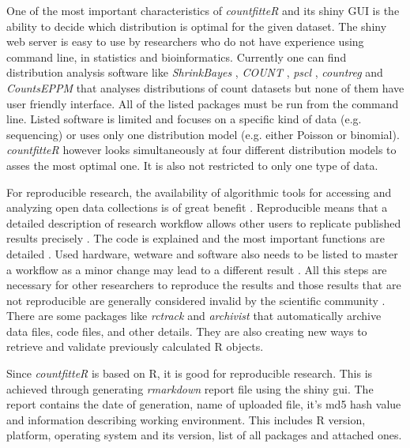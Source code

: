 One of the most important characteristics of \emph{countfitteR} and its shiny GUI is the ability to  decide which distribution is optimal for the given dataset. The shiny web server is easy to use by researchers who do not have experience using command line, in statistics and bioinformatics. 
Currently one can find distribution analysis software like \emph{ShrinkBayes} \citep{shrinkbayes}, \emph{COUNT} \citep{COUNT}, \emph{pscl} \citep{pscl}, \emph{countreg} \citep{countreg} and \emph{CountsEPPM} \citep{countseppm} that analyses distributions of count datasets but none of them have user friendly interface. All of the listed packages must be run from the command line. 
Listed software is limited and focuses on a specific kind of data (e.g. sequencing) or uses only one distribution model (e.g. either Poisson or binomial). \emph{countfitteR} however looks simultaneously at four different distribution models to asses the most optimal one. It is also not restricted to only one type of data. 

For reproducible research, the availability of algorithmic tools for accessing and analyzing open data collections is of great benefit \cite{lahti_retrieval_2017}. Reproducible means that a detailed description of research workflow allows other users to replicate published results precisely \citep{leeper_archiving_2014}. The code is explained and the most important functions are detailed \citep{thioulouse_online_2010}. 
Used hardware, wetware and software also needs to be listed to master a workflow as a minor change may lead to a different result \citep{rodiger_r_2015}. 
All this steps are necessary for other researchers to reproduce the results and those results that are not reproducible are generally considered invalid by the scientific community \citep{rodiger_r_2015}.
There are some packages like \emph{rctrack} \citep{liu_r_2014} and \emph{archivist} \citep{Biecek_2017} that automatically archive data files, code files, and other details. They are also creating new ways to retrieve and validate previously calculated R objects. 

Since \emph{countfitteR} is based on R, it is good for reproducible research. This is achieved through generating \emph{rmarkdown} \citep{rmarkdown} report file using the shiny gui. The report contains the date of generation, name of uploaded file, it's md5 hash value and information describing working environment. This includes R version, platform, operating system and its version, list of all packages and attached ones.

